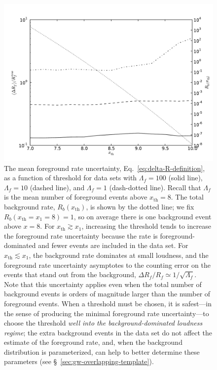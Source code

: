 \documentclass[aps,prd,reprint,nofootinbib]{revtex4-1}
\begin{document}
\begin{figure}
  \includegraphics[width=\columnwidth]{threshold.pdf}
  \caption{\label{fig:threshold-rate-dependence} The mean foreground
    rate uncertainty, Eq.~\eqref{eq:delta-R-definition}, as a function
    of threshold for data sets with $\Lambda_f = 100$ (solid line),
    $\Lambda_f = 10$ (dashed line), and $\Lambda_f = 1$ (dash-dotted
    line).  Recall that $\Lambda_f$ is the mean number of foreground
    events above $x_\mathrm{th} = 8$.  The total background rate,
    $R_b\left( x_\mathrm{th} \right)$, is shown by the dotted line; we
    fix $R_b \left( x_\mathrm{th} = x_1 = 8\right) = 1$, so on average
    there is one background event above $x = 8$.  For $x_\mathrm{th}
    \gtrsim x_1$, increasing the threshold tends to increase the
    foreground rate uncertainty because the rate is
    foreground-dominated and fewer events are included in the data
    set.  For $x_\mathrm{th} \lesssim x_1$, the background rate
    dominates at small loudness, and the foreground rate uncertainty
    asymptotes to the counting error on the events that stand out from
    the background, $\Delta R_f / R_f \simeq 1/\sqrt{\Lambda_f}$.
    Note that this uncertainty applies even when the total number of
    background events is orders of magnitude larger than the number of
    foreground events.  When a threshold must be chosen, it is
    safest---in the sense of producing the minimal foreground rate
    uncertainty---to choose the threshold \emph{well into the
      background-dominated loudness regime}; the extra background
    events in the data set do not affect the estimate of the
    foreground rate, and, when the background distribution is
    parameterized, can help to better determine these parameters (see
    \S~\ref{sec:gw-overlapping-template}). }
\end{figure}
\end{document}
